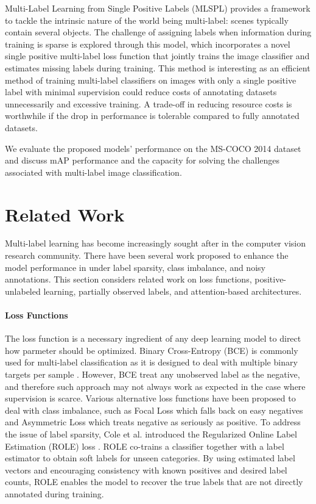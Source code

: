 \documentclass[lettersize,journal]{IEEEtran}
\begin{document}
Multi-Label Learning from Single Positive Labels (MLSPL) provides a framework to tackle the intrinsic nature of the world being multi-label: scenes typically contain several objects. The challenge of assigning labels when information during training is sparse is explored through this model, which incorporates a novel single positive multi-label loss function that jointly trains the image classifier and estimates missing labels during training. This method is interesting as an efficient method of training multi-label classifiers on images with only a single positive label with minimal supervision could reduce costs of annotating datasets unnecessarily and excessive training. A trade-off in reducing resource costs is worthwhile if the drop in performance is tolerable compared to fully annotated datasets. 

We evaluate the proposed models' performance on the MS-COCO 2014 dataset and discuss mAP performance and the capacity for solving the challenges associated with multi-label image classification.

\section{Related Work}
Multi-label learning has become increasingly sought after in the computer vision research community. There have been several work proposed to enhance the model performance in under label sparsity, class imbalance, and noisy annotations. This section considers related work on loss functions, positive-unlabeled learning, partially observed labels, and attention-based architectures.


\paragraph{Loss Functions}
The loss function is a necessary ingredient of any deep learning model to direct how parmeter should be optimized. Binary Cross-Entropy (BCE) is commonly used for multi-label classification as it is designed to deal with multiple binary targets per sample \cite{mlsp,durand2019learningdeepconvnetmultilabel}. However, BCE treat any unobserved label as the negative, and therefore such approach may not always work as expected in the case where supervision is scarce. Various alternative loss functions have been proposed to deal with class imbalance, such as Focal Loss which falls back on easy negatives and Asymmetric Loss which treats negative as seriously as positive.
To address the issue of label sparsity, Cole et al. introduced the Regularized Online Label Estimation (ROLE) loss \cite{mlsp}. ROLE co-trains a classifier together with a label estimator to obtain soft labels for unseen categories. By using estimated label vectors and encouraging consistency with known positives and desired label counts, ROLE enables the model to recover the true labels that are not directly annotated during training.
\end{document}
